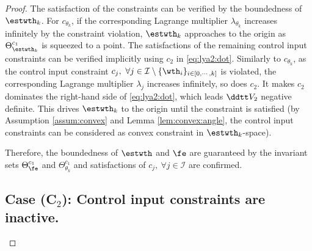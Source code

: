 \documentclass[final,5p,times,twocolumn,authoryear]{elsarticle}
\begin{document}
\begin{proof}
The satisfaction of the constraints can be verified by the boundedness of $\estwth_k$.
For $c_{\theta_k}$, if the corresponding Lagrange multiplier $\lambda_{\theta_k}$ increases infinitely by the constraint violation, $\estwth_k$ approaches to the origin as $\Theta_{\estwth_k}^{c_1}$ is squeezed to a point.
The satisfactions of the remaining control input constraints can be verified implicitly using $c_2$ in \eqref{eq:lya2:dot}.
Similarly to $c_{\theta_k}$, as the control input constraint $c_j,\ \forall j\in\mathcal{I}\setminus \{\wth_i\}_{i\in[0,\cdots,k]}$ is violated, the corresponding Lagrange multiplier $\lambda_j$ increases infinitely, so does $c_2$.
It makes $c_2$ dominates the right-hand side of \eqref{eq:lya2:dot}, which leads $\ddtt V_2$ negative definite.
This drives $\estwth_k$ to the origin until the constraint is satisfied (\ie by Assumption \ref{assum:convex} and Lemma \ref{lem:convex:angle}, the control input constraints can be considered as convex constraint in $\estwth_k$-space).

Therefore, the boundedness of $\estwth$ and $\fe$ are guaranteed by the invariant sets $\Theta_{\fe}^{c_1}$ and $\Theta_{\theta_k}^{c_1}$ and satisfactions of $c_j,\ \forall j\in\mathcal{I}$ are confirmed.

\subsection*{Case (C$_2$): Control input constraints are inactive.}


\end{proof}
\end{document}

